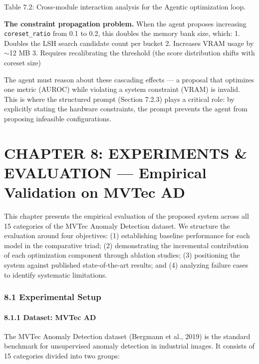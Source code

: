 \documentclass[12pt, a4paper, oneside]{report}
\begin{document}
Table 7.2: Cross-module interaction analysis for the Agentic optimization loop.

\textbf{The constraint propagation problem.} When the agent proposes increasing \texttt{coreset\_ratio} from 0.1 to 0.2, this doubles the memory bank size, which: 1. Doubles the LSH search candidate count per bucket 2. Increases VRAM usage by ${\sim}$12 MB 3. Requires recalibrating the threshold (the score distribution shifts with coreset size)

The agent must reason about these cascading effects --- a proposal that optimizes one metric (AUROC) while violating a system constraint (VRAM) is invalid. This is where the structured prompt (Section 7.2.3) plays a critical role: by explicitly stating the hardware constraints, the prompt prevents the agent from proposing infeasible configurations.

\bigskip\noindent\hrulefill\bigskip

\chapter{CHAPTER 8: EXPERIMENTS \& EVALUATION --- Empirical Validation on MVTec AD}\label{chapter-8-experiments-evaluation-empirical-validation-on-mvtec-ad}

This chapter presents the empirical evaluation of the proposed system across all 15 categories of the MVTec Anomaly Detection dataset. We structure the evaluation around four objectives: (1) establishing baseline performance for each model in the comparative triad; (2) demonstrating the incremental contribution of each optimization component through ablation studies; (3) positioning the system against published state-of-the-art results; and (4) analyzing failure cases to identify systematic limitations.

\bigskip\noindent\hrulefill\bigskip

\subsection{8.1 Experimental Setup}\label{experimental-setup}

\subsubsection{8.1.1 Dataset: MVTec AD}\label{dataset-mvtec-ad}

The MVTec Anomaly Detection dataset (Bergmann et al., 2019) is the standard benchmark for unsupervised anomaly detection in industrial images. It consists of 15 categories divided into two groups:
\end{document}

